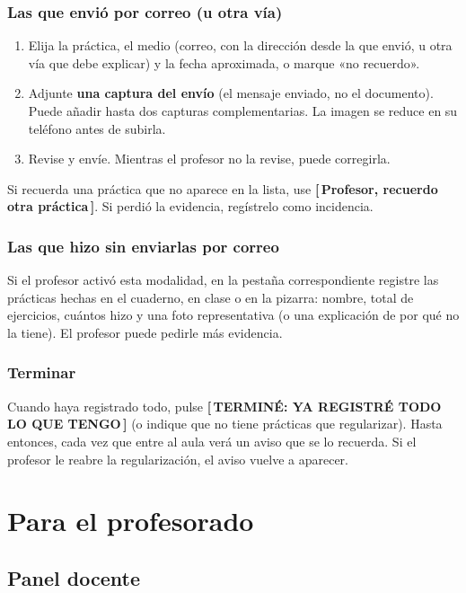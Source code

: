 \documentclass[11pt,a4paper,oneside]{book}
\newcommand{\boton}[1]{\textsf{\textbf{[\,#1\,]}}}
\begin{document}
\section{Las que envió por correo (u otra vía)}
\begin{enumerate}
  \item Elija la práctica, el medio (correo, con la dirección desde la que envió, u otra vía que debe explicar) y la
        fecha aproximada, o marque «no recuerdo».
  \item Adjunte \textbf{una captura del envío} (el mensaje enviado, no el documento). Puede añadir hasta dos capturas
        complementarias. La imagen se reduce en su teléfono antes de subirla.
  \item Revise y envíe. Mientras el profesor no la revise, puede corregirla.
\end{enumerate}
Si recuerda una práctica que no aparece en la lista, use \boton{Profesor, recuerdo otra práctica}. Si perdió la
evidencia, regístrelo como incidencia.

\section{Las que hizo sin enviarlas por correo}
Si el profesor activó esta modalidad, en la pestaña correspondiente registre las prácticas hechas en el cuaderno, en
clase o en la pizarra: nombre, total de ejercicios, cuántos hizo y una foto representativa (o una explicación de por qué
no la tiene). El profesor puede pedirle más evidencia.

\section{Terminar}
Cuando haya registrado todo, pulse \boton{TERMINÉ: YA REGISTRÉ TODO LO QUE TENGO} (o indique que no tiene prácticas
que regularizar). Hasta entonces, cada vez que entre al aula verá un aviso que se lo recuerda. Si el profesor le reabre
la regularización, el aviso vuelve a aparecer.

\part{Para el profesorado}

\chapter{Panel docente}
\end{document}
